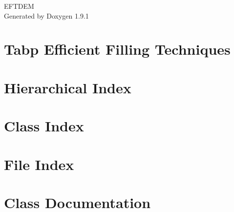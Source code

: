 \let\mypdfximage\pdfximage\def\pdfximage{\immediate\mypdfximage}\documentclass[twoside]{book}
\newcommand{\+}{\discretionary{\mbox{\scriptsize$\hookleftarrow$}}{}{}}
\newcommand{\clearemptydoublepage}{%
  \newpage{\pagestyle{empty}\cleardoublepage}%
}
\begin{document}
\raggedbottom

\hypersetup{pageanchor=false,
             bookmarksnumbered=true,
             pdfencoding=unicode
            }
\begin{titlepage}
\vspace*{7cm}
\begin{center}%
{\Large EFTDEM }\\
\vspace*{1cm}
{\large Generated by Doxygen 1.9.1}\\
\end{center}
\end{titlepage}
\clearemptydoublepage
{}
\tableofcontents
\clearemptydoublepage
{}
\hypersetup{pageanchor=true}

\chapter{Tabp Efficient Filling Techniques}
\label{md__media_stastez_data__code__e_f_t_d_e_m__r_e_a_d_m_e}

\chapter{Hierarchical Index}

\chapter{Class Index}

\chapter{File Index}

\chapter{Class Documentation}







































\end{document}
